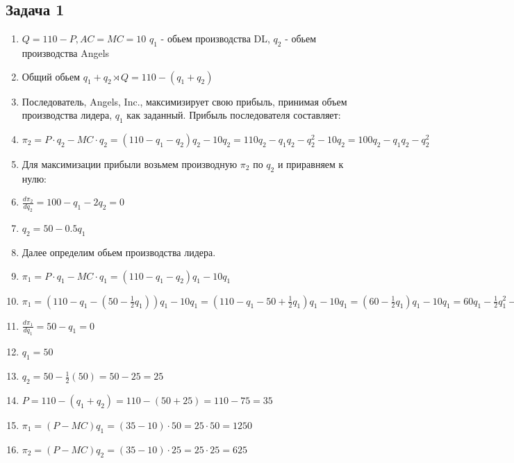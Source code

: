 \documentclass[a4paper,12pt]{article}
\begin{document}
\subsection{Задача 1}
\begin{enumerate}
    \item $Q = 110 - P, AC = MC = 10$ $q_1$ - обьем производства DL, $q_2$ - обьем производства Angels
    \item Общий обьем $q_1+q_2 \rtimes Q = 110-(q_1+q_2)$
    \item Последователь, Angels, Inc., максимизирует свою прибыль, принимая объем производства лидера, $q_1$ как заданный. Прибыль последователя составляет:
    \item $\pi_2 = P \cdot q_2 - MC \cdot q_2 = (110 - q_1 - q_2)q_2 - 10q_2 = 110q_2 - q_1q_2 - q_2^2 - 10q_2 = 100q_2 - q_1q_2 - q_2^2$
    \item Для максимизации прибыли возьмем производную $\pi_2$ по $q_2$ и приравняем к нулю:
    \item $\frac{d\pi_2}{dq_2} = 100 - q_1 - 2q_2 = 0$
    \item $q_2 = 50-0.5q_1$
    \item Далее определим обьем производства лидера.
    \item $\pi_1 = P \cdot q_1 - MC \cdot q_1 = (110 - q_1 - q_2)q_1 - 10q_1$
    \item $\pi_1 = \left(110 - q_1 - \left(50 - \frac{1}{2}q_1\right)\right)q_1 - 10q_1 = \left(110 - q_1 - 50 + \frac{1}{2}q_1\right)q_1 - 10q_1 = \left(60 - \frac{1}{2}q_1\right)q_1 - 10q_1 = 60q_1 - \frac{1}{2}q_1^2 - 10q_1 = 50q_1 - \frac{1}{2}q_1^2$
    \item $\frac{d\pi_1}{dq_1} = 50 - q_1 = 0$
    \item $q_1 = 50$
    \item $q_2 = 50 - \frac{1}{2}(50) = 50 - 25 = 25$
    \item $P = 110 - (q_1 + q_2) = 110 - (50 + 25) = 110 - 75 = 35$
    \item $\pi_1 = (P - MC)q_1 = (35 - 10) \cdot 50 = 25 \cdot 50 = 1250$
    \item $\pi_2 = (P - MC)q_2 = (35 - 10) \cdot 25 = 25 \cdot 25 = 625$
\end{enumerate}
\end{document}
